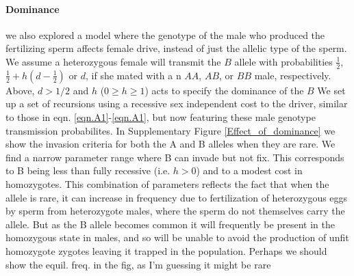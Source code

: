 \documentclass[12pt,letterpaper]{article}
\newcommand{\gc}[1]{{ \color{red} #1}}
\begin{document}
\paragraph{Dominance} we also explored a model where
the genotype of the male who produced the fertilizing sperm affects female drive,
instead of just the allelic type of the sperm.
 We assume a heterozygous female will transmit the $B$ allele 
  with probabilities  $\frac{1}{2}$,  $\frac{1}{2} + h(d-\frac{1}{2}) $ or $d$, 
 if she mated with a n $AA$, $AB$, or $BB$ male,  respectively.
 Above, $d > 1/2$ and $h$ ($0 \geq h \geq 1$) acts to specify the dominance of the $B$
We set up a set of recursions using a recessive sex independent cost to
the driver, similar to those in eqn.
\ref{eqn.A1}-\ref{eqn.A1}, but now featuring these male genotype
transmission probabilites. In Supplementary Figure \ref{Effect_of_dominance} we show the invasion
criteria for both the A and B alleles when they are rare. 
We find a narrow parameter range where B 
can invade but not fix.
This corresponds to B being less than fully recessive (i.e. $h>0$) and to a modest cost in homozygotes. 
This combination of parameters reflects the fact that when the allele is rare, 
it can increase in frequency due to fertilization of heterozygous eggs
by sperm from heterozygote males, where the sperm do not themselves
carry the allele. But as the B allele becomes common it will frequently be
present in the homozygous state in males, and so will be unable to
avoid the production of unfit homozygote zygotes leaving it trapped in
the population. \gc{Perhaps we should show the equil. freq. in the
  fig, as I'm guessing it might be rare}
\end{document}
